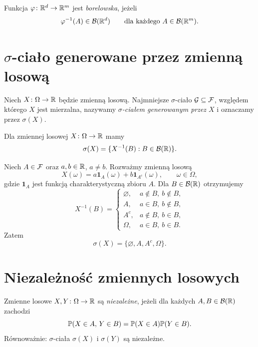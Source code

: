 \begin{uwaga}
Funkcja $\varphi\colon\mathbb{R}^d\to\mathbb{R}^m$ jest \emph{borelowska}, jeżeli
\[
  \varphi^{-1}(A)\in\mathcal{B}(\mathbb{R}^d)
  \qquad\text{dla każdego }A\in\mathcal{B}(\mathbb{R}^m).
\]
\end{uwaga}

\section{\texorpdfstring{$\sigma$}{sigma}-ciało generowane przez zmienną losową}
\label{sec:sigma-zmiennej-losowej}

\begin{definicja}
\label{def:sigma-zmiennej-losowej}
Niech $X\colon\Omega\to\mathbb{R}$ będzie zmienną losową.
Najmniejsze $\sigma$-ciało $\mathcal G\subseteq\mathcal{F}$, względem którego
$X$ jest mierzalna, nazywamy \emph{$\sigma$-ciałem generowanym przez $X$}
i oznaczamy przez $\sigma(X)$.
\end{definicja}

\begin{fakt}
\label{fakt:postac-sigma-x}
Dla zmiennej losowej $X\colon\Omega\to\mathbb{R}$ mamy
\[
  \sigma(X)=\{X^{-1}(B):B\in\mathcal{B}(\mathbb{R})\}.
\]
\end{fakt}

\begin{przyklad}
\label{przykl:sigma-dwie-wartosci}
Niech $A\in\mathcal{F}$ oraz $a,b\in\mathbb{R}$, $a\ne b$. Rozważmy zmienną losową
\[
  X(\omega)=a\mathbf{1}_A(\omega)+b\mathbf{1}_{A^c}(\omega),
  \qquad\omega\in\Omega,
\]
gdzie $\mathbf{1}_A$ jest funkcją charakterystyczną zbioru $A$.
Dla $B\in\mathcal{B}(\mathbb{R})$ otrzymujemy
\[
  X^{-1}(B)=
  \begin{cases}
    \varnothing,&a\notin B,\ b\notin B,\\
    A,&a\in B,\ b\notin B,\\
    A^c,&a\notin B,\ b\in B,\\
    \Omega,&a\in B,\ b\in B.
  \end{cases}
\]
Zatem
\[
  \sigma(X)=\{\varnothing,A,A^c,\Omega\}.
\]
\end{przyklad}

\section{Niezależność zmiennych losowych}
\label{sec:niezaleznosc-zmiennych-losowych}

\begin{definicja}
\label{def:niezaleznosc-zmiennych-losowych}
Zmienne losowe $X,Y\colon\Omega\to\mathbb{R}$ są \emph{niezależne}, jeżeli
dla każdych $A,B\in\mathcal{B}(\mathbb{R})$ zachodzi
\[
  \mathbb{P}(X\in A,\,Y\in B)=\mathbb{P}(X\in A)\mathbb{P}(Y\in B).
\]
Równoważnie: $\sigma$-ciała $\sigma(X)$ i $\sigma(Y)$ są niezależne.
\end{definicja}

